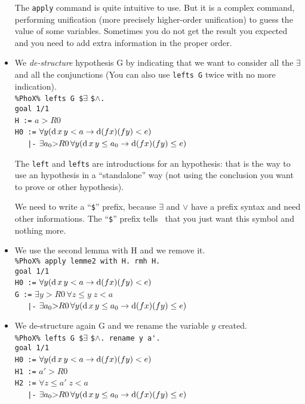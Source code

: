 \begin{itemize}
The \verb~apply~ command is quite intuitive to use. But it is a complex
command, performing unification (more precisely higher-order
unification) to guess the value of some variables.
Sometimes you do not get the result you expected and you need
to add extra information in the proper order.

\item We {\em de-structure} hypothesis G by indicating that we want to consider all the
 $\exists$ and all the  conjunctions (You can also use  \verb~lefts G~ twice with no more indication).\\
\verb~%PhoX% lefts G $~$\exists$ \verb~$~$\land$\verb~.~\\
\verb~goal 1/1~\\
\verb~H :=~  $a > R0$\\
\verb~H0 :=~ $\forall y (\hbox{d}\,x\,y < a \to \hbox{d} (f x) (f y) < e)$\\
\verb~   |-~ $\exists a_0{>}R0 \,\forall y (\hbox{d}\,x\,y \leq a_0 \to \hbox{d} (f x) (f y) \leq e)$

The \verb~left~ and \verb~lefts~ are introductions for an hypothesis:
that is the way to use an hypothesis in a ``standalone'' way (not
using the conclusion you want to prove or other hypothesis).

We need to write a ``\verb~$~'' prefix, because $\exists$ and $\lor$ have
a prefix syntax and need other informations. The ``\verb~$~'' prefix tells
\AFD\ that you just want this
symbol and nothing more.

\item We use the second lemma with  H and we remove it.\\
\verb~%PhoX% apply lemme2 with H. rmh H.~\\
\verb~goal 1/1~\\
\verb~H0 :=~ $\forall y (\hbox{d}\,x\,y < a \to \hbox{d} (f x) (f y) < e)$\\
\verb~G :=~ $\exists y{>}R0 \, \forall z{\leq}y \;  z < a$\\
\verb~   |-~ $\exists a_0{>}R0 \,\forall y (\hbox{d}\,x\,y \leq a_0 \to \hbox{d} (f x) (f y) \leq e)$

\item We de-structure again G and we rename the variable $y$ created.\\
\verb~%PhoX% lefts G $~$\exists$ \verb~$~$\land$\verb~. rename y a'.~\\
\verb~goal 1/1~\\
\verb~H0 :=~ $\forall y (\hbox{d}\,x\,y < a \to \hbox{d} (f x) (f y) < e)$\\
\verb~H1 :=~ $a' > R0$\\
\verb~H2 :=~ $\forall z{\leq}a' \; z < a$\\
\verb~   |-~ $\exists a_0{>}R0 \, \forall y (\hbox{d}\,x\,y \leq a_0 \to \hbox{d} (f x) (f y) \leq e)$


\end{itemize}
